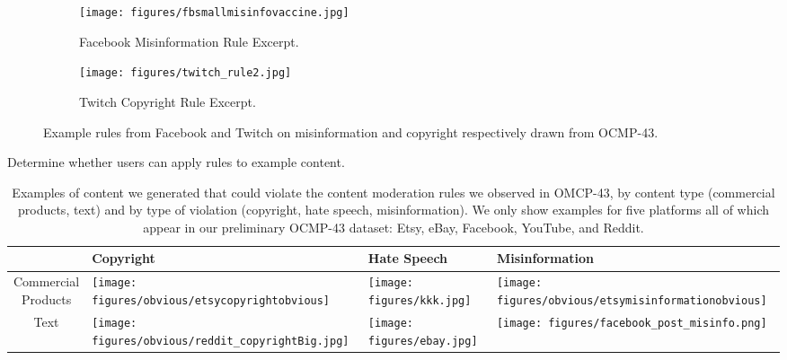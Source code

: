 \begin{figure}[t]
        \centering
        \begin{subfigure}{0.4\textwidth}
            \texttt{[image: figures/fbsmallmisinfovaccine.jpg]}
            \caption{Facebook Misinformation Rule Excerpt.}
            \label{fig:FBmisinforule}
        \end{subfigure}
        \hfill
        \begin{subfigure}{0.4\textwidth}
            \texttt{[image: figures/twitch\_rule2.jpg]}
            \caption{Twitch Copyright Rule Excerpt.}
            \label{fig:Twitchcopyrightrule}
        \end{subfigure}
        
        \caption{Example rules from Facebook and Twitch on misinformation and copyright respectively drawn from OCMP-43.}
        \label{fig:example_rules_OMCP43}
        \end{figure}
\fi



\begin{task}
Determine whether users can apply rules to example content.
\end{task}


\label{sec:rule-implementation}
\begin{table}[t]
    \begin{tabular}{c|p{1.8in}|p{1.8in}|p{1.8in}}
        & {\bf Copyright} & {\bf Hate Speech} & {\bf Misinformation} \\ \hline
        \parbox{0.7in}{Commercial\\ Products} &
        \parbox[c]{\hsize}{\texttt{[image: figures/obvious/etsycopyrightobvious]}} &
        \parbox[c]{\hsize}{\texttt{[image: figures/kkk.jpg]}} &
        \parbox[c]{\hsize}{\texttt{[image: figures/obvious/etsymisinformationobvious]}}
        \\ \hline
    Text & 
        \parbox[c]{\hsize}{\texttt{[image: figures/obvious/reddit\_copyrightBig.jpg]}}  & 
        \parbox[c]{\hsize}{\texttt{[image: figures/ebay.jpg]}} & 
      \parbox[c]{\hsize}{\texttt{[image: figures/facebook\_post\_misinfo.png]}} 
        \\ \hline
    \end{tabular}
    \caption{Examples of content we generated that could violate the content moderation
    rules we observed in OMCP-43, by content type (commercial products, 
    text) and by type of violation (copyright, hate speech, misinformation).
    We only show examples for five platforms all of which appear in our preliminary OCMP-43 dataset: Etsy, eBay, Facebook, YouTube, and Reddit.}
    \label{tab:example_content}
\end{table}

